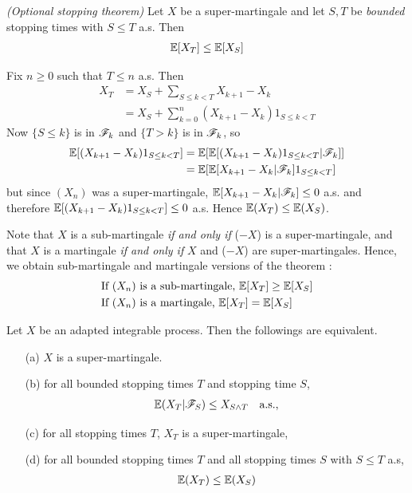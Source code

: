 \documentclass[10pt,a4paper]{report}
\newenvironment{proof}
{\begin{changemargin}{1cm}{0.5cm} 
	}%
	{\end{changemargin}
}
\begin{document}
 \emph{(Optional stopping theorem)} Let $X$ be a super-martingale and let $S,T$ be \emph{bounded} stopping times with $S \leq T$ a.s. Then
\begin{align*}
\mathbb{E}[X_T] \leq \mathbb{E}[X_S]
\end{align*}
\begin{proof}
\pf Fix $n\geq 0$ such that $T\leq n$ a.s. Then
\begin{align*}
X_T &= X_S + \sum_{S\leq k <T} X_{k+1} - X_k  \\
&= X_S + \sum_{k=0}^n (X_{k+1} - X_k) 1_{S\leq k <T}
\end{align*}
Now $\{S\leq k\}$ is in $\mathscr{F}_k$ and $\{T>k\}$ is in $\mathscr{F}_k$, so
\begin{align*}
\mathbb{E}[(X_{k+1} - X_k)1_{S\leq k <T}  ] &= \mathbb{E} [\mathbb{E}[ (X_{k+1} - X_k) 1_{S\leq k<T} |\mathscr{F}_k ]] \\
& = \mathbb{E}[ \mathbb{E} [  X_{k+1} -X_k | \mathscr{F}_k ] 1_{S\leq k < T} ]
\end{align*}
but since $(X_n)$ was a super-martingale,  $\mathbb{E} [  X_{k+1} -X_k | \mathscr{F}_k ] \leq 0$ a.s. and therefore $\mathbb{E}[(X_{k+1} - X_k)1_{S\leq k <T}  ] \leq 0$ a.s. Hence $\mathbb{E}(X_T) \leq \mathbb{E}(X_S)$.

\eop
\end{proof}
\s

\bull Note that $X$ is a sub-martingale \emph{if and only if} ($-X$) is a super-martingale, and that $X$ is a martingale \emph{if and only if} $X$ and ($-X$) are super-martingales. Hence, we obtain sub-martingale and martingale versions of the theorem :
\begin{align*}
&\text{If } (X_n) \text{ is a sub-martingale, } \mathbb{E}[X_T] \geq \mathbb{E}[X_S] \\
&\text{If } (X_n) \text{ is a martingale, } \mathbb{E}[X_T] = \mathbb{E}[X_S]
\end{align*}
\s

 Let $X$ be an adapted integrable process. Then the followings are equivalent.
\begin{itemize}
\item[(a)] $X$ is a super-martingale. 
\item[(b)] for all bounded stopping times $T$ and stopping time $S$,
\begin{align*}
\mathbb{E}(X_T |\mathscr{F}_S) \leq X_{S\wedge T} \quad \text{a.s.},
\end{align*}
\item[(c)] for all stopping times $T$, $X_T$ is a super-martingale,
\item[(d)] for all bounded stopping times $T$ and all stopping times $S$ with $S\leq T$ a.s,
\begin{align*}
\mathbb{E}(X_T) \leq \mathbb{E}(X_S)
\end{align*}
\end{itemize}
\end{document}
